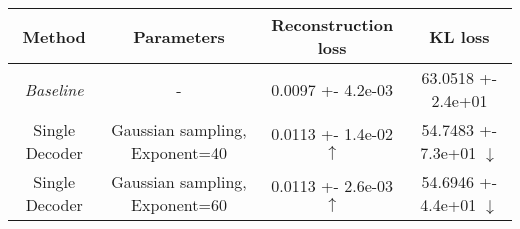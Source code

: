 \centering
\scriptsize
\begin{tabular}{||c|c|c|c||}
\hline
 Method & Parameters & Reconstruction loss & KL loss \\
\hline
\textit{Baseline} & - & 0.0097 +- 4.2e-03 & 63.0518 +- 2.4e+01 \\
\hline
Single Decoder & Gaussian sampling, Exponent=40 & 0.0113 +- 1.4e-02  $\uparrow$ & 54.7483 +- 7.3e+01  $\downarrow$ \\
\hline
Single Decoder & Gaussian sampling, Exponent=60 & 0.0113 +- 2.6e-03  $\uparrow$ & 54.6946 +- 4.4e+01  $\downarrow$ \\
\hline
\end{tabular}
